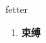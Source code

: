 
\begin{frame}
{\huge fetter}
\begin{center}
\begin{enumerate}\Large
  \item \textbf{束缚}
\end{enumerate}
\end{center}
\end{frame}
